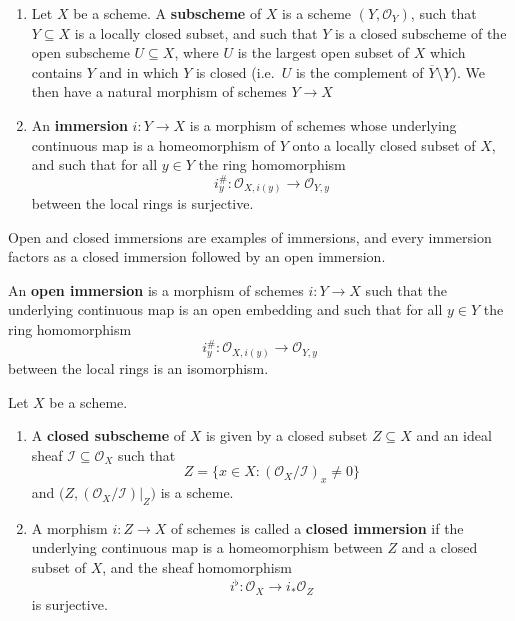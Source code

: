 \documentclass[12pt]{article}
\begin{document}
\begin{definition}
    \leavevmode
    \begin{enumerate}
        \item Let \(X\) be a scheme. A \textbf{subscheme} of \(X\) is a scheme \((Y,\mathcal O_Y)\), such that \(Y \subseteq X\) is a locally closed subset, and such that \(Y\) is a closed subscheme of the open subscheme \(U \subseteq X\), where \(U\) is the largest open subset of \(X\) which contains \(Y\) and in which \(Y\) is closed (i.e.\ \(U\) is the complement of \(\overline{Y}\setminus Y\)). We then have a natural morphism of schemes $Y \to X$

        \item An \textbf{immersion} \(i:Y \to X\) is a morphism of schemes whose underlying continuous map is a homeomorphism of \(Y\) onto a locally closed subset of \(X\), and such that for all \(y\in Y\) the ring homomorphism
              \[
                  i_y^\#:\mathcal O_{X,i(y)} \to \mathcal O_{Y,y}
              \]
              between the local rings is surjective.
    \end{enumerate}
\end{definition}

Open and closed immersions are examples of immersions, and every immersion factors as a closed immersion followed by an open immersion.

\begin{definition}
    An \textbf{open immersion} is a morphism of schemes \(i:Y \to X\) such that the underlying continuous map is an open embedding and such that for all \(y\in Y\) the ring homomorphism
    \[
        i_y^\#:\mathcal O_{X,i(y)} \to \mathcal O_{Y,y}
    \]
    between the local rings is an isomorphism.
\end{definition}

\begin{definition}
    Let \(X\) be a scheme.
    \begin{enumerate}
        \item A \textbf{closed subscheme} of \(X\) is given by a closed subset \(Z \subseteq X\) and an ideal sheaf $\mathcal I \subseteq \mathcal O_X$
              such that
              \[
                  Z=\{x\in X : (\mathcal O_X/\mathcal I)_x \neq 0\}
              \]
              and \(\bigl(Z,(\mathcal O_X/\mathcal I)|_Z\bigr)\) is a scheme.

        \item A morphism \(i:Z \to X\) of schemes is called a \textbf{closed immersion} if the underlying continuous map is a homeomorphism between \(Z\) and a closed subset of \(X\), and the sheaf homomorphism
              \[
                  i^\flat:\mathcal O_X \to i_*\mathcal O_Z
              \]
              is surjective.
    \end{enumerate}
\end{definition}
\end{document}
